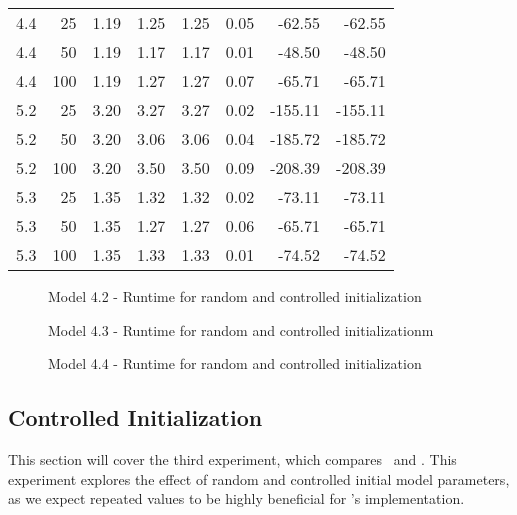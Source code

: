 \begin{table}
\begin{tabular}{rrrrrrrr}
        4.4           & 25  & 1.19 & 1.25     & 1.25      & 0.05   & -62.55     & -62.55    \\
        4.4           & 50  & 1.19 & 1.17     & 1.17      & 0.01   & -48.50     & -48.50    \\
        4.4           & 100 & 1.19 & 1.27     & 1.27      & 0.07   & -65.71     & -65.71    \\
        5.2           & 25  & 3.20 & 3.27     & 3.27      & 0.02   & -155.11    & -155.11   \\
        5.2           & 50  & 3.20 & 3.06     & 3.06      & 0.04   & -185.72    & -185.72   \\
        5.2           & 100 & 3.20 & 3.50     & 3.50      & 0.09   & -208.39    & -208.39   \\
        5.3           & 25  & 1.35 & 1.32     & 1.32      & 0.02   & -73.11     & -73.11    \\
        5.3           & 50  & 1.35 & 1.27     & 1.27      & 0.06   & -65.71     & -65.71    \\
        5.3           & 100 & 1.35 & 1.33     & 1.33      & 0.01   & -74.52     & -74.52    \\
        \bottomrule
    \end{tabular}
\end{table}


\begin{figure}
    
    \caption{Model 4.2 - Runtime for random and controlled initialization}
    \label{fig:semirandom-cupaal-jajapy-4-2}
\end{figure}

\begin{figure}
    
    \caption{Model 4.3 - Runtime for random and controlled initializationm}
    \label{fig:semirandom-cupaal-jajapy-4-3}
\end{figure}

\begin{figure}
    
    \caption{Model 4.4 - Runtime for random and controlled initialization}
    \label{fig:semirandom-cupaal-jajapy-4-4}
\end{figure}

\subsection{Controlled Initialization}\label{subsec:controled_initialization}
This section will cover the third experiment, which compares \Cupaal\ and \Jajapy.
This experiment explores the effect of random and controlled initial model parameters, as we expect repeated values to be highly beneficial for \Cupaal’s implementation.

